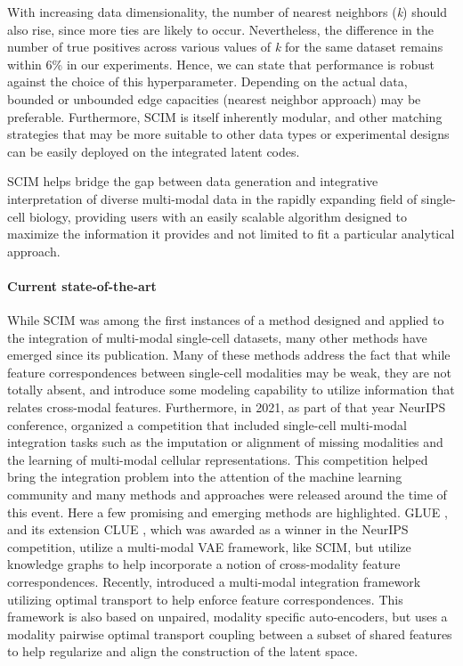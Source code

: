 With increasing data dimensionality, the number of nearest neighbors (\textit{k}) should also rise, since more ties are likely to occur.
Nevertheless, the difference in the number of true positives across various values of \textit{k} for the same dataset remains within 6\% in our experiments.
Hence, we can state that performance is robust against the choice of this hyperparameter.
Depending on the actual data, bounded or unbounded edge capacities (nearest neighbor approach) may be preferable.
Furthermore, SCIM is itself inherently modular, and other matching strategies that may be more suitable to other data types or experimental designs can be easily deployed on the integrated latent codes.

SCIM helps bridge the gap between data generation and integrative interpretation of diverse multi-modal data in the rapidly expanding field of single-cell biology, providing users with an easily scalable algorithm designed to maximize the information it provides and not limited to fit a particular analytical approach.

\paragraph{Current state-of-the-art}
While SCIM was among the first instances of a method designed and applied to the integration of multi-modal single-cell datasets, many other methods have emerged since its publication.
Many of these methods address the fact that while feature correspondences between single-cell modalities may be weak,  they are not totally absent, and introduce some modeling capability to utilize information that relates cross-modal features. 
Furthermore, in 2021, as part of that year NeurIPS conference, \citeauthor{lance2022} organized a competition that included single-cell multi-modal integration tasks such as the imputation or alignment of missing modalities and the learning of multi-modal cellular representations.
This competition helped bring the integration problem into the attention of the machine learning community and many methods and approaches were released around the time of this event.
Here a few promising and emerging methods are highlighted.
GLUE \cite{cao2022a}, and its extension CLUE \cite{tu2022}, which was awarded as a winner in the NeurIPS competition,
utilize a multi-modal VAE framework, like SCIM, but utilize knowledge graphs to help incorporate a notion of cross-modality feature correspondences.
Recently, \citeauthor{samaran2024} introduced a multi-modal integration framework utilizing optimal transport to help enforce feature correspondences.
This framework is also based on unpaired, modality specific auto-encoders, but uses a modality pairwise optimal transport coupling between a subset of shared features to help regularize and align the construction of the latent space.

